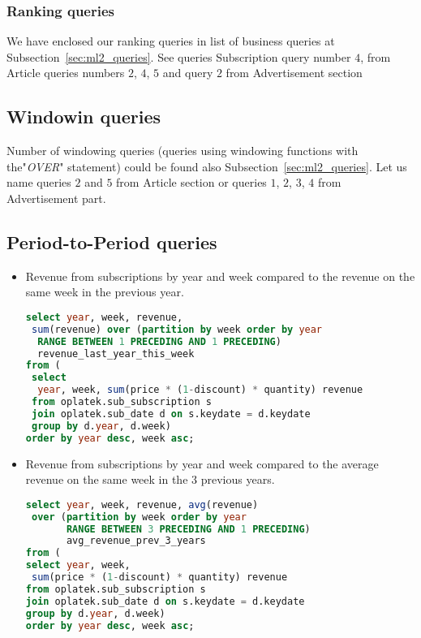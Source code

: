 \subsubsection{Ranking queries} %
\label{ssub:Ranking queries}
We have enclosed our ranking queries in list of business queries at Subsection~\ref{sec:ml2_queries}.
See queries Subscription query number $4$, from Article queries numbers $2$, $4$, $5$
and query $2$ from Advertisement section

\subsection{Windowin queries} %
\label{sub:Windowin queries}
Number of windowing queries (queries using windowing functions with the"{\it OVER}" statement)
could be found also Subsection~\ref{sec:ml2_queries}.
Let us name queries $2$ and $5$ from Article section or queries $1$, $2$, $3$, $4$ from Advertisement part.

\subsection{Period-to-Period queries} %
\label{sub:Period-to-Period queries}
\begin{itemize}
    \item Revenue from subscriptions by year and week compared to the revenue on the same week in the previous year.
\begin{lstlisting}[language=sql] 
select year, week, revenue, 
 sum(revenue) over (partition by week order by year 
  RANGE BETWEEN 1 PRECEDING AND 1 PRECEDING) 
  revenue_last_year_this_week        
from (
 select 
  year, week, sum(price * (1-discount) * quantity) revenue 
 from oplatek.sub_subscription s 
 join oplatek.sub_date d on s.keydate = d.keydate 
 group by d.year, d.week)
order by year desc, week asc;
\end{lstlisting}

\item Revenue from subscriptions by year and week compared to the average revenue on the same week in the 3 previous years.
\begin{lstlisting}[language=sql] 
select year, week, revenue, avg(revenue) 
 over (partition by week order by year 
       RANGE BETWEEN 3 PRECEDING AND 1 PRECEDING) 
       avg_revenue_prev_3_years        
from (
select year, week, 
 sum(price * (1-discount) * quantity) revenue 
from oplatek.sub_subscription s 
join oplatek.sub_date d on s.keydate = d.keydate
group by d.year, d.week)
order by year desc, week asc;
\end{lstlisting}

\end{itemize}

